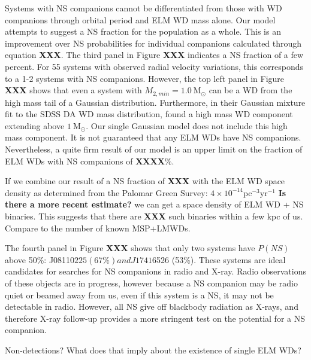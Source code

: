 \documentclass[letterpaper,12pt,preprint]{aastex}
\newcommand{\Msun}{\mathrm{M}_\odot}
\begin{document}
Systems with NS companions cannot be differentiated from those with WD companions through orbital period and ELM WD mass alone. Our model attempts to suggest a NS fraction for the population as a whole. This is an improvement over NS probabilities for individual companions calculated through equation {\bf XXX}. The third panel in Figure {\bf XXX} indicates a NS fraction of a few percent. For 55 systems with observed radial velocity variations, this corresponds to a 1-2 systems with NS companions. However, the top left panel in Figure {\bf XXX} shows that even a system with $M_{2,min}=1.0~\Msun$ can be a WD from the high mass tail of a Gaussian distribution. Furthermore, in their Gaussian mixture fit to the SDSS DA WD mass distribution, \citet{kleinman13} found a high mass WD component extending above $1~\Msun$. Our single Gaussian model does not include this high mass component. It is not guaranteed that any ELM WDs have NS companions. Nevertheless, a quite firm result of our model is an upper limit on the fraction of ELM WDs with NS companions of {\bf XXXX}\%.


If we combine our result of a NS fraction of {\bf XXX} with the ELM WD space density as determined from the Palomar Green Survey: $4\times10^{-14}$pc$^{-3}$yr$^{-1}$ \cite{liebert05} {\bf Is there a more recent estimate?} we can get a space density of ELM WD + NS binaries. This suggests that there are {\bf XXX} such binaries within a few kpc of us. Compare to the number of known MSP+LMWDs.


The fourth panel in Figure {\bf XXX} shows  that only two systems have $P(NS)$ above 50\%: J0811$0225 (67\%) and J1741$6526 (53\%). These systems are ideal candidates for searches for NS companions in radio and X-ray. Radio observations of these objects are in progress, however because a NS companion may be radio quiet or beamed away from us, even if this system is a NS, it may not be detectable in radio. However, all NS give off blackbody radiation as X-rays, and therefore X-ray follow-up provides a more stringent test on the potential for a NS companion.


Non-detections? What does that imply about the existence of single ELM WDs?
\end{document}
